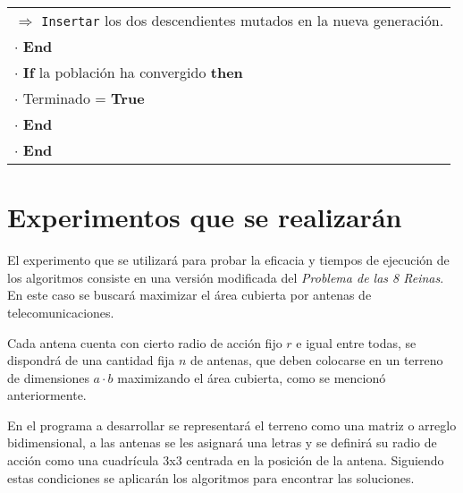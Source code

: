 \begin{table}[H]
\begin{tabular}{l}
     \hspace{1.8cm} $\Rightarrow$ \texttt{Insertar} los dos descendientes mutados en la nueva generación.\\
     \hspace{1.2cm} $\cdot$ \textbf{End}\\
     \hspace{1.2cm} $\cdot$ \textbf{If}  la población ha convergido \textbf{then}\\
     \hspace{1.2cm} $\cdot$ Terminado = \textbf{True}\\
     \hspace{0.6cm} $\cdot$ \textbf{End}\\
     $\cdot$ \textbf{End}\\
     
    \hline
\end{tabular}
\end{table}

\section{Experimentos que se realizarán}

El experimento que se utilizará para probar la eficacia y tiempos de ejecución de los algoritmos consiste en una versión modificada del \textit{Problema de las 8 Reinas}. En este caso se buscará maximizar el área cubierta por antenas de telecomunicaciones. 

Cada antena cuenta con cierto radio de acción fijo $r$ e igual entre todas, se dispondrá de una cantidad fija $n$ de antenas, que deben colocarse en un terreno de dimensiones $a \cdot b$ maximizando el área cubierta, como se mencionó anteriormente. 

En el programa a desarrollar se representará el terreno como una matriz o arreglo bidimensional, a las antenas se les asignará una letras y se definirá su radio de acción como una cuadrícula 3x3 centrada en la posición de la antena. Siguiendo estas condiciones se aplicarán los algoritmos para encontrar las soluciones.


